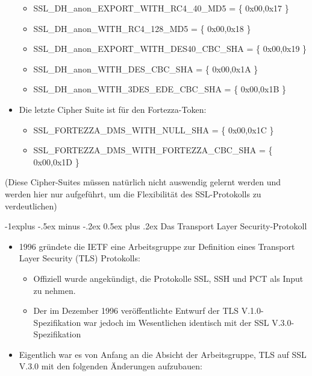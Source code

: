 \documentclass[a4paper]{article}
\makeatletter
\renewcommand{\subsection}{\@startsection{subsection}{2}{0mm}%
 {-1explus -.5ex minus -.2ex}%
 {0.5ex plus .2ex}%
 {\normalfont\normalsize\bfseries}}
\makeatother
\begin{document}
\begin{multicols}{3}
\begin{itemize}
              \begin{itemize}
                  \item
                        SSL\_DH\_anon\_EXPORT\_WITH\_RC4\_40\_MD5 = \{ 0x00,0x17 \}
                  \item
                        SSL\_DH\_anon\_WITH\_RC4\_128\_MD5 = \{ 0x00,0x18 \}
                  \item
                        SSL\_DH\_anon\_EXPORT\_WITH\_DES40\_CBC\_SHA = \{ 0x00,0x19 \}
                  \item
                        SSL\_DH\_anon\_WITH\_DES\_CBC\_SHA = \{ 0x00,0x1A \}
                  \item
                        SSL\_DH\_anon\_WITH\_3DES\_EDE\_CBC\_SHA = \{ 0x00,0x1B \}
              \end{itemize}
        \item
              Die letzte Cipher Suite ist für den Fortezza-Token:

              \begin{itemize}
                  \item
                        SSL\_FORTEZZA\_DMS\_WITH\_NULL\_SHA = \{ 0x00,0x1C \}
                  \item
                        SSL\_FORTEZZA\_DMS\_WITH\_FORTEZZA\_CBC\_SHA = \{ 0x00,0x1D \}
              \end{itemize}
    \end{itemize}

    (Diese Cipher-Suites müssen natürlich nicht auswendig gelernt werden und
    werden hier nur aufgeführt, um die Flexibilität des SSL-Protokolls zu
    verdeutlichen)


    \subsection{Das Transport Layer
        Security-Protokoll}

    \begin{itemize}
        \item
              1996 gründete die IETF eine Arbeitsgruppe zur Definition eines
              Transport Layer Security (TLS) Protokolls:

              \begin{itemize}
                  \item
                        Offiziell wurde angekündigt, die Protokolle SSL, SSH und PCT als
                        Input zu nehmen.
                  \item
                        Der im Dezember 1996 veröffentlichte Entwurf der TLS
                        V.1.0-Spezifikation war jedoch im Wesentlichen identisch mit der SSL
                        V.3.0-Spezifikation
              \end{itemize}
        \item
              Eigentlich war es von Anfang an die Absicht der Arbeitsgruppe, TLS auf
              SSL V.3.0 mit den folgenden Änderungen aufzubauen:


\end{itemize}
\end{multicols}
\end{document}
